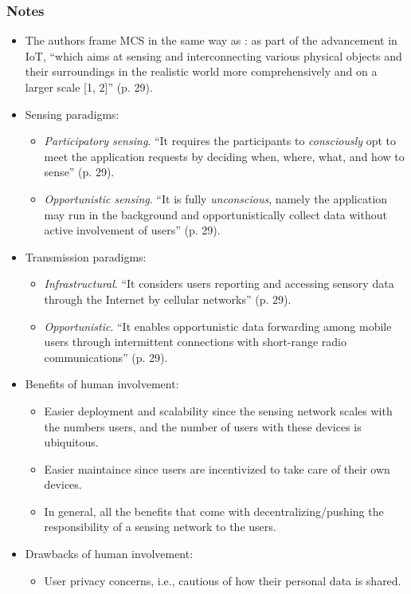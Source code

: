 \subsubsection*{Notes}
\begin{itemize}
\item The authors frame MCS in the same way as \cite{Lane2010}: as part of the advancement in IoT, ``which aims at sensing and interconnecting various physical objects and their surroundings in the realistic world more comprehensively and on a larger scale [1, 2]'' (p. 29).
\item Sensing paradigms:
	\begin{itemize}
		\item \emph{Participatory sensing}. ``It requires the participants to \emph{consciously} opt to meet the application requests by deciding when, where, what, and how to sense'' (p. 29).
		\item \emph{Opportunistic sensing}. ``It is fully \emph{unconscious}, namely the application may run in the background and opportunistically collect data without active involvement of users'' (p. 29).
	\end{itemize}
\item Transmission paradigms:
	\begin{itemize}
	\item \emph{Infrastructural}. ``It considers users reporting and accessing sensory data through the Internet by cellular networks'' (p. 29).
	\item \emph{Opportunistic}. ``It enables opportunistic data forwarding among mobile users through intermittent connections with short-range radio communications'' (p. 29).
	\end{itemize}
\item Benefits of human involvement:
	\begin{itemize}
	\item Easier deployment and scalability since the sensing network scales with the numbers users, and the number of users with these devices is ubiquitous.
	\item Easier maintaince since users are incentivized to take care of their own devices.
	\item In general, all the benefits that come with decentralizing/pushing the responsibility of a sensing network to the users.
	\end{itemize}
\item Drawbacks of human involvement:
	\begin{itemize}
	\item User privacy concerns, i.e., cautious of how their personal data is shared.

\end{itemize}
\end{itemize}

